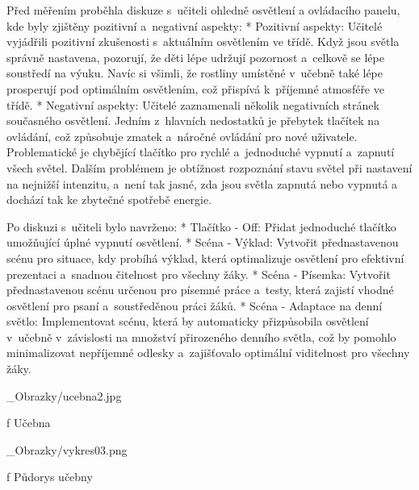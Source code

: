 \medskip\noindent
Před měřením proběhla diskuze s~učiteli ohledně osvětlení a ovládacího panelu, kde byly zjištěny pozitivní a~negativní aspekty:
\begitems
    * {\sbf Pozitivní aspekty:}
    Učitelé vyjádřili pozitivní zkušenosti s~aktuálním osvětlením ve třídě. Když jsou světla správně nastavena,
    pozorují, že děti lépe udržují pozornost a~celkově se lépe soustředí na výuku. Navíc si všimli, že rostliny
    umístěné v~učebně také lépe prosperují pod optimálním osvětlením, což přispívá k~příjemné atmosféře ve třídě.
    \medskip
    * {\sbf Negativní aspekty:}
    Učitelé zaznamenali několik negativních stránek současného osvětlení. Jedním z~hlavních nedostatků je přebytek
    tlačítek na ovládání, což způsobuje zmatek a~náročné ovládání pro nové uživatele. Problematické je chybějící
    tlačítko pro rychlé a~jednoduché vypnutí a~zapnutí všech světel. Dalším problémem je obtížnost rozpoznání
    stavu světel při nastavení na nejnižší intenzitu, a~není tak jasné, zda jsou světla zapnutá nebo vypnutá
    a dochází tak ke zbytečné spotřebě energie.
\enditems

\medskip\noindent
Po diskuzi s~učiteli bylo navrženo:
\begitems
    * {\sbf Tlačítko - Off:} Přidat jednoduché tlačítko umožňující úplné vypnutí osvětlení.
    * {\sbf Scéna - Výklad:} Vytvořit přednastavenou scénu pro situace, kdy probíhá výklad, která optimalizuje
        osvětlení pro efektivní prezentaci a~snadnou čitelnost pro všechny žáky.
    * {\sbf Scéna - Písemka:} Vytvořit přednastavenou scénu určenou pro písemné práce a~testy, která
        zajistí vhodné osvětlení pro psaní a~soustředěnou práci žáků.
    * {\sbf Scéna - Adaptace na denní světlo:} Implementovat scénu, která by automaticky přizpůsobila
        osvětlení v~učebně v~závislosti na množství přirozeného denního světla, což by pomohlo minimalizovat
        nepříjemné odlesky a~zajišťovalo optimální viditelnost pro všechny žáky.
\enditems

\medskip {}
\picw=8cm _Obrazky/ucebna2.jpg
\caption/f Učebna
\medskip

\medskip {}
\picw=20cm _Obrazky/vykres03.png
\caption/f Půdorys učebny
\medskip






